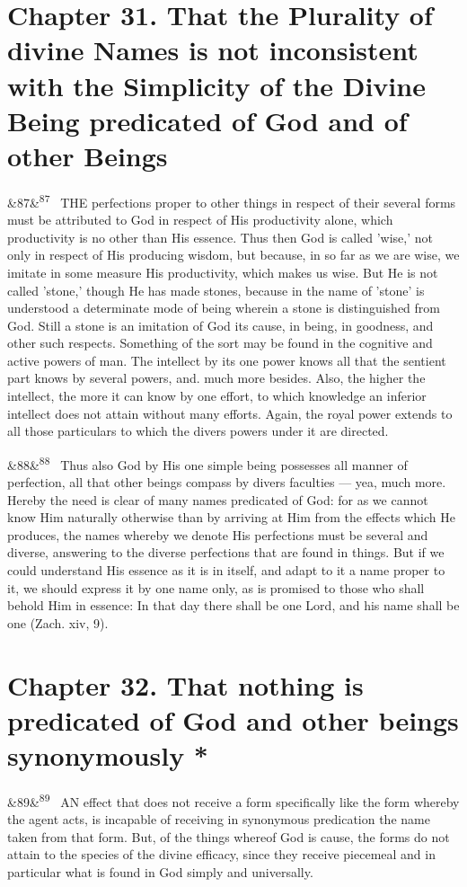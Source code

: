 \documentclass[12pt]{article}
\newcommand{\para}[1][]{\par\noindent\ifx&#1&\else\textsuperscript{\footnotesize #1}~\fi}
\begin{document}
\section*{Chapter 31. That the Plurality of divine Names is not inconsistent with the Simplicity of the Divine Being predicated of God and of other Beings}

\para[87] THE perfections proper to other things in respect of their several forms must be attributed to God in respect of His productivity alone, which productivity is no other than His essence. Thus then God is called 'wise,' not only in respect of His producing wisdom, but because, in so far as we are wise, we imitate in some measure His productivity, which makes us wise. But He is not called 'stone,' though He has made stones, because in the name of 'stone' is understood a determinate mode of being wherein a stone is distinguished from God. Still a stone is an imitation of God its cause, in being, in goodness, and other such respects. Something of the sort may be found in the cognitive and active powers of man. The intellect by its one power knows all that the sentient part knows by several powers, and. much more besides. Also, the higher the intellect, the more it can know by one effort, to which knowledge an inferior intellect does not attain without many efforts. Again, the royal power extends to all those particulars to which the divers powers under it are directed.

\para[88] Thus also God by His one simple being possesses all manner of perfection, all that other beings compass by divers faculties --- yea, much more. Hereby the need is clear of many names predicated of God: for as we cannot know Him naturally otherwise than by arriving at Him from the effects which He produces, the names whereby we denote His perfections must be several and diverse, answering to the diverse perfections that are found in things. But if we could understand His essence as it is in itself, and adapt to it a name proper to it, we should express it by one name only, as is promised to those who shall behold Him in essence: In that day there shall be one Lord, and his name shall be one (Zach. xiv, 9).

\section*{Chapter 32. That nothing is predicated of God and other beings synonymously *}

\para[89] AN effect that does not receive a form specifically like the form whereby the agent acts, is incapable of receiving in synonymous predication the name taken from that form. But, of the things whereof God is cause, the forms do not attain to the species of the divine efficacy, since they receive piecemeal and in particular what is found in God simply and universally.
\end{document}
